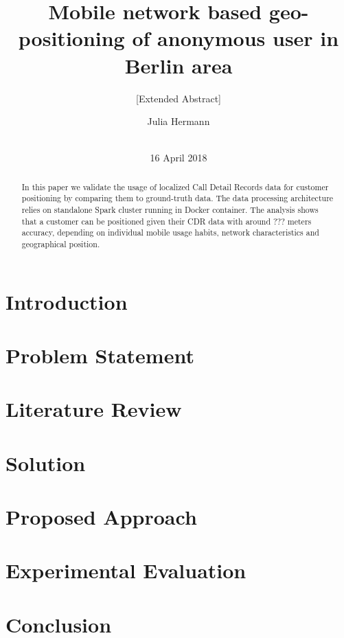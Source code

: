 \documentclass{sig-alternate-05-2015}
\begin{document}
\title{Mobile network based geo-positioning of anonymous user in Berlin area}
\subtitle{[Extended Abstract]}

\author{
\alignauthor
Julia Hermann\\
       \\
}

\maketitle
\date{16 April 2018}
\begin{abstract}
In this paper we validate the usage of localized Call Detail Records data for customer positioning by comparing them to ground-truth data. The data processing architecture relies on standalone Spark cluster running in Docker container. The analysis shows that a customer can be positioned given their CDR data with around ??? meters accuracy, depending on individual mobile usage habits, network characteristics and geographical position.

\end{abstract}
\section{Introduction}
\section{Problem Statement}
\section{Literature Review}
\section{Solution}
\section{Proposed Approach}
\section{Experimental Evaluation}
\section{Conclusion}



\end{document}

